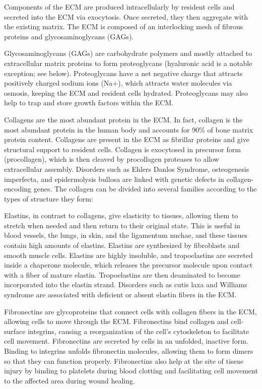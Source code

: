 \documentclass[
]{book}
\begin{document}
Components of the ECM are produced intracellularly by resident cells and secreted into the ECM via exocytosis. Once secreted, they then aggregate with the existing matrix. The ECM is composed of an interlocking mesh of fibrous proteins and glycosaminoglycans (GAGs).

Glycosaminoglycans (GAGs) are carbohydrate polymers and mostly attached to extracellular matrix proteins to form proteoglycans (hyaluronic acid is a notable exception; see below). Proteoglycans have a net negative charge that attracts positively charged sodium ions (Na+), which attracts water molecules via osmosis, keeping the ECM and resident cells hydrated. Proteoglycans may also help to trap and store growth factors within the ECM.

Collagens are the most abundant protein in the ECM. In fact, collagen is the most abundant protein in the human body and accounts for 90\% of bone matrix protein content. Collagens are present in the ECM as fibrillar proteins and give structural support to resident cells. Collagen is exocytosed in precursor form (procollagen), which is then cleaved by procollagen proteases to allow extracellular assembly. Disorders such as Ehlers Danlos Syndrome, osteogenesis imperfecta, and epidermolysis bullosa are linked with genetic defects in collagen-encoding genes. The collagen can be divided into several families according to the types of structure they form:

Elastins, in contrast to collagens, give elasticity to tissues, allowing them to stretch when needed and then return to their original state. This is useful in blood vessels, the lungs, in skin, and the ligamentum nuchae, and these tissues contain high amounts of elastins. Elastins are synthesized by fibroblasts and smooth muscle cells. Elastins are highly insoluble, and tropoelastins are secreted inside a chaperone molecule, which releases the precursor molecule upon contact with a fiber of mature elastin. Tropoelastins are then deaminated to become incorporated into the elastin strand. Disorders such as cutis laxa and Williams syndrome are associated with deficient or absent elastin fibers in the ECM.

Fibronectins are glycoproteins that connect cells with collagen fibers in the ECM, allowing cells to move through the ECM. Fibronectins bind collagen and cell-surface integrins, causing a reorganization of the cell's cytoskeleton to facilitate cell movement. Fibronectins are secreted by cells in an unfolded, inactive form. Binding to integrins unfolds fibronectin molecules, allowing them to form dimers so that they can function properly. Fibronectins also help at the site of tissue injury by binding to platelets during blood clotting and facilitating cell movement to the affected area during wound healing.
\end{document}

